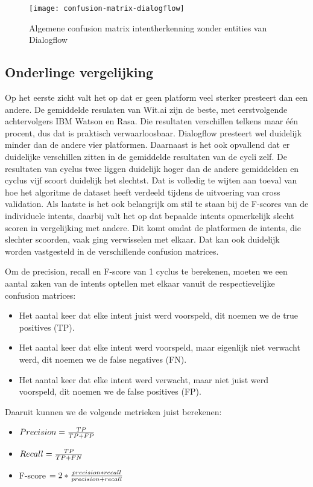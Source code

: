 \begin{figure}[H]
    \label{fig:confusion-matrix-dialogflow}
    \centering
    \texttt{[image: confusion-matrix-dialogflow]}
    \caption{Algemene confusion matrix intentherkenning zonder entities van Dialogflow}
\end{figure}

\subsection{Onderlinge vergelijking}
\label{subsec:intent-onderling}

Op het eerste zicht valt het op dat er geen platform veel sterker presteert dan een andere. De gemiddelde resulaten van Wit.ai zijn de beste, met eerstvolgende achtervolgers IBM Watson en Rasa. Die resultaten verschillen telkens maar één procent, dus dat is praktisch verwaarloosbaar. Dialogflow presteert wel duidelijk minder dan de andere vier platformen. Daarnaast is het ook opvallend dat er duidelijke verschillen zitten in de gemiddelde resultaten van de cycli zelf. De resultaten van cyclus twee liggen duidelijk hoger dan de andere gemiddelden en cyclus vijf scoort duidelijk het slechtst. Dat is volledig te wijten aan toeval van hoe het algoritme de dataset heeft verdeeld tijdens de uitvoering van cross validation. Als laatste is het ook belangrijk om stil te staan bij de F-scores van de individuele intents, daarbij valt het op dat bepaalde intents opmerkelijk slecht scoren in vergelijking met andere. Dit komt omdat de platformen de intents, die slechter scoorden, vaak ging verwisselen met elkaar. Dat kan ook duidelijk worden vastgesteld in de verschillende confusion matrices.

Om de precision, recall en F-score van 1 cyclus te berekenen, moeten we een aantal zaken van de intents optellen met elkaar vanuit de respectievelijke confusion matrices:
\begin{itemize}
    \item Het aantal keer dat elke intent juist werd voorspeld, dit noemen we de true positives (TP).
    \item Het aantal keer dat elke intent werd voorspeld, maar eigenlijk niet verwacht werd, dit noemen we de false negatives (FN).
    \item Het aantal keer dat elke intent werd verwacht, maar niet juist werd voorspeld, dit noemen we de false positives (FP).
\end{itemize}
Daaruit kunnen we de volgende metrieken juist berekenen:
\begin{itemize}
    \item $Precision = \frac{TP}{TP + FP}\\$
    \item $Recall = \frac{TP}{TP + FN}\\$
    \item F-score $= 2 * \frac{precision*recall}{precision+recall}\\$
\end{itemize}


